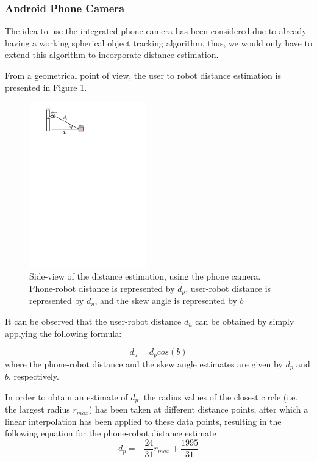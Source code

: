 \documentclass[journal]{IEEEtran}
\let\MYoriglatexcaption\caption
\renewcommand{\caption}[2][\relax]{\MYoriglatexcaption[#2]{#2}}
\begin{document}
\subsubsection{Android Phone Camera}
The idea to use the integrated phone camera has been considered due to already having a working spherical object tracking algorithm, thus, we would only have to extend this algorithm to incorporate distance estimation.

From a geometrical point of view, the user to robot distance estimation is presented in Figure \ref{fig:dist_camera}.
%
\begin{figure}[htpb]
 \centering
\includegraphics[width=2in]{images/distance_meas}
\caption{Side-view of the distance estimation, using the phone camera. Phone-robot distance is represented by $d_p$, user-robot distance is represented by $d_u$, and the skew angle is represented by $b$}
\label{fig:dist_camera}
\end{figure}
%
It can be observed that the user-robot distance $d_u$ can be obtained by simply applying the following formula:

\begin{equation}
d_u=d_pcos(b)
\label{eq:dist_estim}
\end{equation}
where the phone-robot distance and the skew angle estimates are given by $d_p$ and $b$, respectively.

In order to obtain an estimate of $d_p$, the radius values of the closest circle (i.e. the largest radius $r_{max}$) has been taken at different distance points, after which a linear interpolation has been applied to these data points, resulting in the following equation for the phone-robot distance estimate
\begin{equation}
d_p=-\frac{24}{31}r_{max}+\frac{1995}{31}
\end{equation}
\end{document}
